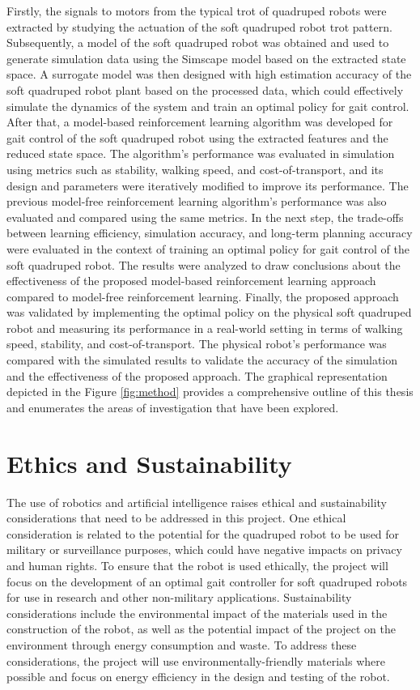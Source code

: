 Firstly, the signals to motors from the typical trot of quadruped robots were extracted by studying the actuation of the soft quadruped robot trot pattern. Subsequently, a model of the soft quadruped robot was obtained and used to generate simulation data using the Simscape model based on the extracted state space. A surrogate model was then designed with high estimation accuracy of the soft quadruped robot plant based on the processed data, which could effectively simulate the dynamics of the system and train an optimal policy for gait control. After that, a model-based reinforcement learning algorithm was developed for gait control of the soft quadruped robot using the extracted features and the reduced state space. The algorithm's performance was evaluated in simulation using metrics such as stability, walking speed, and cost-of-transport, and its design and parameters were iteratively modified to improve its performance. The previous model-free reinforcement learning algorithm's performance was also evaluated and compared using the same metrics. In the next step, the trade-offs between learning efficiency, simulation accuracy, and long-term planning accuracy were evaluated in the context of training an optimal policy for gait control of the soft quadruped robot. The results were analyzed to draw conclusions about the effectiveness of the proposed model-based reinforcement learning approach compared to model-free reinforcement learning. Finally, the proposed approach was validated by implementing the optimal policy on the physical soft quadruped robot and measuring its performance in a real-world setting in terms of walking speed, stability, and cost-of-transport. The physical robot's performance was compared with the simulated results to validate the accuracy of the simulation and the effectiveness of the proposed approach. The graphical representation depicted in the Figure \ref{fig:method} provides a comprehensive outline of this thesis and enumerates the areas of investigation that have been explored.

 
\section{Ethics and Sustainability}
The use of robotics and artificial intelligence raises ethical and sustainability considerations that need to be addressed in this project. One ethical consideration is related to the potential for the quadruped robot to be used for military or surveillance purposes, which could have negative impacts on privacy and human rights. To ensure that the robot is used ethically, the project will focus on the development of an optimal gait controller for soft quadruped robots for use in research and other non-military applications. Sustainability considerations include the environmental impact of the materials used in the construction of the robot, as well as the potential impact of the project on the environment through energy consumption and waste. To address these considerations, the project will use environmentally-friendly materials where possible and focus on energy efficiency in the design and testing of the robot.

